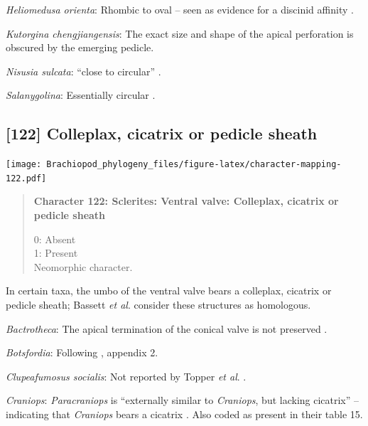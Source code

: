 \documentclass[openany]{book}
\begin{document}
\hypertarget{Heliomedusa_orienta-coding-121}{}
\emph{Heliomedusa orienta}: Rhombic to oval -- seen as evidence for a
discinid affinity \citep{Chen2007Reinterpretationof}.

\hypertarget{Kutorgina_chengjiangensis-coding-121}{}
\emph{Kutorgina chengjiangensis}: The exact size and shape of the apical
perforation is obscured by the emerging pedicle.

\hypertarget{Nisusia_sulcata-coding-121}{}
\emph{Nisusia sulcata}: ``close to circular''
\citep{Holmer2018Evolutionarysignificance}.

\hypertarget{Salanygolina-coding-121}{}
\emph{Salanygolina}: Essentially circular \citep[fig.
4]{Holmer2009Theenigmatic}.

\subsection*{{[}122{]} Colleplax, cicatrix or pedicle
sheath}\label{colleplax-cicatrix-or-pedicle-sheath}

\texttt{[image: Brachiopod\_phylogeny\_files/figure-latex/character-mapping-122.pdf]}

\begin{quote}
\textbf{Character 122: Sclerites: Ventral valve: Colleplax, cicatrix or
pedicle sheath}

0: Absent\\
1: Present\\
Neomorphic character.
\end{quote}

In certain taxa, the umbo of the ventral valve bears a colleplax,
cicatrix or pedicle sheath; Bassett \emph{et al}.
\citeyearpar{Bassett2008Earlyontogeny} consider these structures as
homologous.

\hypertarget{Bactrotheca-coding-122}{}
\emph{Bactrotheca}: The apical termination of the conical valve is not
preserved \citep{Valent2012}.

\hypertarget{Botsfordia-coding-122}{}
\emph{Botsfordia}: Following \citet{Williams1998Thediversity}, appendix
2.

\hypertarget{Clupeafumosus_socialis-coding-122}{}
\emph{Clupeafumosus socialis}: Not reported by Topper \emph{et al}.
\citeyearpar{Topper2013Reappraisalof}.

\hypertarget{Craniops-coding-122}{}
\emph{Craniops}: \emph{Paracraniops} is ``externally similar to
\emph{Craniops}, but lacking cicatrix'' -- indicating that
\emph{Craniops} bears a cicatrix
\citep{Williams2000LinguliformeaCraniiformea}. Also coded as present in
their table 15.
\end{document}
